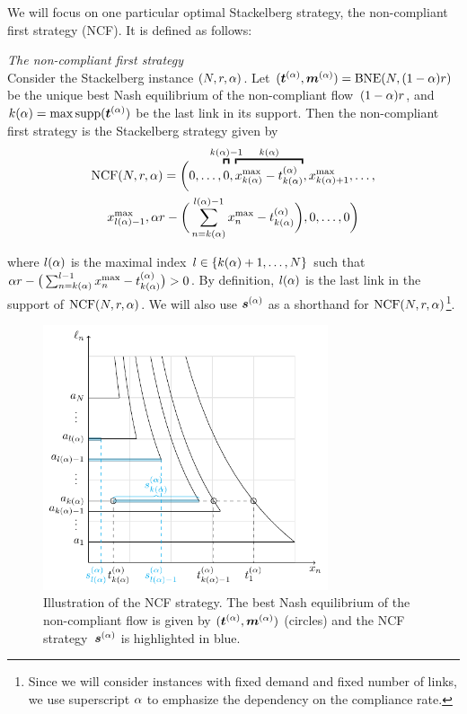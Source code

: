We will focus on one particular optimal Stackelberg strategy, the non-compliant first strategy (NCF). It is defined as follows:
\begin{definition}\emph{The non-compliant first strategy}
\\
Consider the Stackelberg instance $(N, r, \alpha)$. Let ${ (\boldsymbol {t}^{(\alpha)}, \boldsymbol {m}^{(\alpha)}) = \textup{BNE} (N, (1 - \alpha) r) }$ be the unique best Nash equilibrium of the non-compliant flow~$(1-\alpha) r$, and $k(\alpha) = \max \textup{supp}(\boldsymbol {t}^{(\alpha)})$ be the last link in its support. Then the non-compliant first strategy is the Stackelberg strategy given by
\begin{multline}
\stdStack\NCF = \bigg( 0, \dots, \overbracBig{0}{\lastNC{\cR}-1}, \overbracBig{\flowMax_{\lastNC{\cR}}-t^{(\cR)}_{\lastNC{\cR}}}{\lastNC{\cR}}, \flowMax_{\lastNC{\cR}+1}, \dots, \\
\flowMax_{\lastStack{\cR}-1}, \compRate\demand - \bigg( \sum_{n = \lastNC{\cR}}^{\lastStack{\cR}-1} \flowMax_n-t^{(\cR)}_{\lastNC{\cR}} \bigg), 0, \dots, 0 \bigg)
\label{eq:NCF}
\end{multline}

where $l(\alpha)$ is the maximal index $l \in \{k(\alpha)+1 , \dots, N \}$ such that ${\alpha r - \big( \sum_{n = k(\alpha)}^{l-1} x^{\max}_n - t^{(\alpha)}_{k(\alpha)} \big) > 0} $. By definition, $l(\alpha)$ is the last link in the support of $\textup{NCF} (N, r, \alpha)$. We will also use $\boldsymbol {s}^{(\alpha)}$ as a shorthand for $\textup{NCF} (N, r, \alpha)$\footnote{Since we will consider instances with fixed demand and fixed number of links, we use superscript $\alpha$ to emphasize the dependency on the compliance rate.}.
\end{definition}

\begin{figure}[h]
\centering
\includegraphics[width=3.3in]{TikZ/stack_NCF_new.pdf}
\caption{Illustration of the NCF strategy. The best Nash equilibrium of the non-compliant flow is given by $(\boldsymbol {t}^{(\alpha)}, \boldsymbol {m}^{(\alpha)})$ (circles) and the NCF strategy~$\boldsymbol {s}^{(\alpha)}$ is highlighted in blue.}
\label{fig:ncf}
\end{figure}

